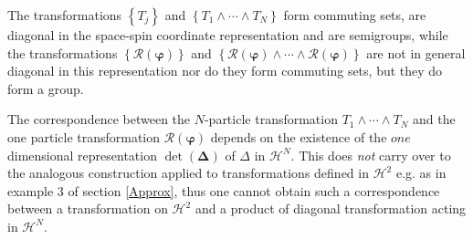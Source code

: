 \documentclass[aps,preprint]{revtex4}%
\begin{document}
The transformations $\left\{  T_{j}\right\}  $ and $\left\{  T_{1}\wedge
\cdots\wedge T_{N}\right\}  $ form commuting sets, are diagonal in the
space-spin coordinate representation and are semigroups, while the
transformations $\left\{  \mathcal{R}\left(  \mathbf{\varphi}\right)
\right\}  $ and $\left\{  \mathcal{R}\left(  \mathbf{\varphi}\right)
\wedge\cdots\wedge\mathcal{R}\left(  \mathbf{\varphi}\right)  \right\}  $ are
not in general diagonal in this representation nor do they form commuting
sets, but they do form a group.

The correspondence between the $N$-particle transformation $T_{1}\wedge
\cdots\wedge T_{N}$ and the one particle transformation $\mathcal{R}\left(
\mathbf{\varphi}\right)  $ depends on the existence of the $one$ dimensional
representation $\det\left(  \mathbf{\Delta}\right)  $ of $\Delta$ in
$\mathcal{H}^{N}$. This does \emph{not }carry over to the analogous
construction applied to transformations defined in $\mathcal{H}^{2}$ e.g. as
in example 3 of section \ref{Approx}, thus one cannot obtain such a
correspondence between a transformation on $\mathcal{H}^{2}$ and a product of
diagonal transformation acting in $\mathcal{H}^{N}$.
\end{document}
